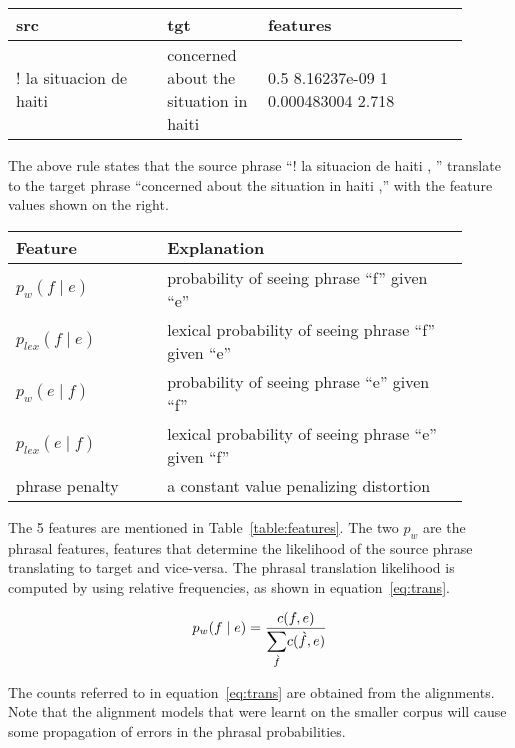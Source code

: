 \begin{table*}
\small
\small
\centering
\begin{tabular}{p{0.3\linewidth}p{0.2\linewidth}p{0.4\linewidth}}
\toprule
src & tgt & features \\
\toprule
! la situacion de haiti & concerned about the situation in haiti & 0.5 8.16237e-09 1 0.000483004 2.718 \\
\bottomrule
\end{tabular}
\end{table*}

The above rule states that the source phrase ``! la situacion de haiti , '' translate to the target phrase ``concerned about the situation in haiti ,'' with the feature values shown on the right. 

\begin{table*}
	\small
	\small
	\begin{tabular}{p{0.3\linewidth}p{0.6\linewidth}}
	\toprule
	Feature &  Explanation \\
	\toprule
	$p_{w}(f \mid e)$ & probability of seeing phrase ``f'' given ``e'' \\
	$p_{lex}(f \mid e)$ & lexical probability of seeing phrase ``f'' given ``e'' \\
	$p_{w}(e \mid f)$ & probability of seeing phrase ``e'' given ``f'' \\
	$p_{lex}(e \mid f)$ & lexical probability of seeing phrase ``e'' given ``f'' \\
   	phrase penalty & a constant value penalizing distortion \\
	\bottomrule
	\end{tabular}
	\caption{Features of the phrase pairs, where ``f'' is foreign/source \& ``e'' is target/english}
	\label{table:features}
\end{table*}

The 5 features are mentioned in Table~\ref{table:features}. The two $p_{w}$ are the phrasal features, features that determine the likelihood of the source phrase translating to target and vice-versa. The phrasal translation likelihood is computed by using relative frequencies, as shown in equation~\eqref{eq:trans}.

\begin{equation} \label{eq:trans}
	p_{w}(f \mid e) = \frac{c(f, e)}{\mathlarger{\sum\limits_{\grave{f}}}c(\grave{f}, e)}
\end{equation}

The counts referred to in equation~\eqref{eq:trans} are obtained from the alignments. Note that the alignment models that were learnt on the smaller corpus will cause some propagation of errors in the phrasal probabilities. 

